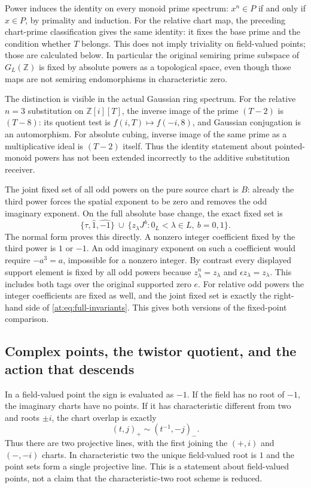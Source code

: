 \documentclass[11pt,a4paper]{article}
\theoremstyle{definition}\newtheorem{definition}[theorem]{Definition}
\newcommand{\Z}{\mathbb Z}\newcommand{\Q}{\mathbb Q}
\begin{document}
Power induces the identity on every monoid prime spectrum:
$x^n\in P$ if and only if $x\in P$, by primality and induction.
For the relative chart map, the preceding chart-prime classification
gives the same identity: it fixes the base prime and the condition
whether $T$ belongs. This does not imply triviality on field-valued
points; those are calculated below. In particular the original
semiring prime subspace of $G_L(\Z)$ is fixed by absolute powers
as a topological space, even though those maps are not semiring
endomorphisms in characteristic zero.

The distinction is visible in the actual Gaussian ring spectrum.
For the relative $n=3$ substitution on $\Z[i][T]$, the inverse
image of the prime $(T-2)$ is $(T-8)$: its quotient test is
$f(i,T)\mapsto f(-i,8)$, and Gaussian conjugation is an
automorphism. For absolute cubing, inverse image of the same
prime as a multiplicative ideal is $(T-2)$ itself. Thus the
identity statement about pointed-monoid powers has not been
extended incorrectly to the additive substitution receiver.

The joint fixed set of all odd powers on the pure source chart is
$B$: already the third power forces the spatial exponent to be
zero and removes the odd imaginary exponent. On the full
absolute base change, the exact fixed set is
\[
 \{\tau,\widehat1,\widehat{-1}\}
 \ \cup\ \{z_\lambda J^b:0_L<\lambda\in L,\ b=0,1\}.
 \tag{AT20}\label{at:eq:full-power-fixed}
\]
The normal form proves this directly. A nonzero integer coefficient
fixed by the third power is $1$ or $-1$. An odd imaginary exponent
on such a coefficient would require $-a^3=a$, impossible for a
nonzero integer. By contrast every displayed support element is
fixed by all odd powers because $z_\lambda^n=z_\lambda$ and
$\epsilon z_\lambda=z_\lambda$. This includes both tags over
the original supported zero $e$.
For relative odd powers the integer coefficients are fixed as
well, and the joint fixed set is exactly the right-hand side of
\eqref{at:eq:full-invariants}. This gives both versions of the
fixed-point comparison.

\subsection{Complex points, the twistor quotient, and the action that descends}

In a field-valued point the sign is evaluated as $-1$. If the field
has no root of $-1$, the imaginary charts have no points. If it
has characteristic different from two and roots $\pm i$, the
chart overlap is exactly
\[
 (t,j)_+\sim(t^{-1},-j)_-.
 \tag{AT21}\label{at:eq:point-overlap}
\]
Thus there are two projective lines, with the first joining the
$(+,i)$ and $(-,-i)$ charts. In characteristic two the unique
field-valued root is $1$ and the point sets form a single
projective line. This is a statement about field-valued points,
not a claim that the characteristic-two root scheme is reduced.
\end{document}
